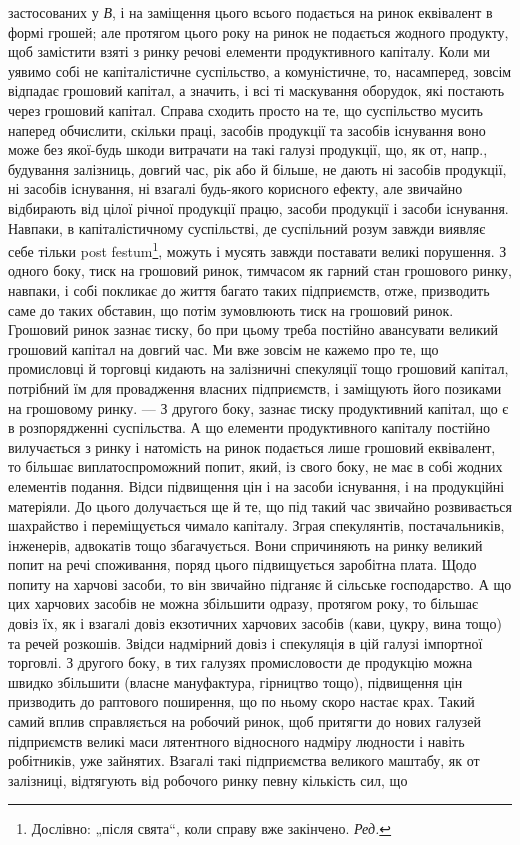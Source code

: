 \parcont{}  %
застосованих у \emph{В}, і на заміщення цього всього подається на ринок еквівалент
в формі грошей; але протягом цього року на ринок не подається
жодного продукту, щоб замістити взяті з ринку речові елементи продуктивного
капіталу. Коли ми уявимо собі не капіталістичне суспільство,
а комуністичне, то, насамперед, зовсім відпадає грошовий капітал, а значить,
і всі ті маскування оборудок, які постають через грошовий капітал.
Справа сходить просто на те, що суспільство мусить наперед обчислити,
скільки праці, засобів продукції та засобів існування воно може без якої-будь
шкоди витрачати на такі галузі продукції, що, як от, напр., будування
залізниць, довгий час, рік або й більше, не дають ні засобів
продукції, ні засобів існування, ні взагалі будь-якого корисного ефекту,
але звичайно відбирають від цілої річної продукції працю, засоби продукції
і засоби існування. Навпаки, в капіталістичному суспільстві, де
суспільний розум завжди виявляє себе тільки post festum\footnote*{
Дослівно: „після свята“, коли справу вже закінчено. \emph{Ред.}
}, можуть і мусять
завжди поставати великі порушення. З одного боку, тиск на грошовий
ринок, тимчасом як гарний стан грошового ринку, навпаки, і собі покликає
до життя багато таких підприємств, отже, призводить саме до таких обставин,
що потім зумовлюють тиск на грошовий ринок. Грошовий ринок
зазнає тиску, бо при цьому треба постійно авансувати великий грошовий
капітал на довгий час. Ми вже зовсім не кажемо про те, що промисловці
й торговці кидають на залізничні спекуляції тощо грошовий капітал,
потрібний їм для провадження власних підприємств, і заміщують його позиками
на грошовому ринку. — З другого боку, зазнає тиску продуктивний капітал,
що є в розпорядженні суспільства. А що елементи продуктивного капіталу
постійно вилучається з ринку і натомість на ринок подається лише
грошовий еквівалент, то більшає виплатоспроможний попит, який, із свого
боку, не має в собі жодних елементів подання. Відси підвищення цін
і на засоби існування, і на продукційні матеріяли. До цього долучається
ще й те, що під такий час звичайно розвивається шахрайство і переміщується
чимало капіталу. Зграя спекулянтів, постачальників, інженерів,
адвокатів тощо збагачується. Вони спричиняють на ринку великий попит
на речі споживання, поряд цього підвищується заробітна плата. Щодо
попиту на харчові засоби, то він звичайно підганяє й сільське господарство.
А що цих харчових засобів не можна збільшити одразу, протягом
року, то більшає довіз їх, як і взагалі довіз екзотичних харчових
засобів (кави, цукру, вина тощо) та речей розкошів. Звідси надмірний
довіз і спекуляція в цій галузі імпортної торговлі. З другого боку, в
тих галузях промисловости де продукцію можна швидко збільшити (власне
мануфактура, гірництво тощо), підвищення цін призводить до раптового
поширення, що по ньому скоро настає крах. Такий самий вплив
справляється на робочий ринок, щоб притягти до нових галузей підприємств
великі маси лятентного відносного надміру людности і навіть робітників,
уже зайнятих. Взагалі такі підприємства великого маштабу, як
от залізниці, відтягують від робочого ринку певну кількість сил, що
\parbreak{}  %
